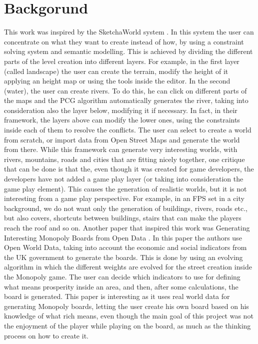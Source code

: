 \documentclass[conference]{IEEEtran}
\begin{document}
\section{Backgorund}

This work was inspired by the SketchaWorld system \cite{sketchaworld}. In this system the user can concentrate on what they want to create instead of how, by using a constraint solving system and semantic modelling. This is achieved by dividing the different parts of the level creation into different layers. For example, in the first layer (called landscape) the user can create the terrain, modify the height of it applying an height map or using the tools inside the editor. In the second (water), the user can create rivers. To do this, he can click on different parts of the maps and the PCG algorithm automatically generates the river, taking into consideration also the layer below, modifying it if necessary. In fact, in their framework, the layers above can modify the lower ones, using the constraints inside each of them to resolve the conflicts. The user can select to create a world from scratch, or import data from Open Street Maps and generate the world from there. \newline\newline
While this framework can generate very interesting worlds, with rivers, mountains, roads and cities that are fitting nicely together, one critique that can be done is that the, even though it was created for game developers, the developers have not added a game play layer (or taking into consideration the game play element). This causes the generation of realistic worlds, but it is not interesting from a game play perspective. For example, in an FPS set in a city background, we do not want only the generation of buildings, rivers, roads etc., but also covers, shortcuts between buildings, stairs that can make the players reach the roof and so on.
\newline
\newline
Another paper that inspired this work was Generating Interesting Monopoly Boards from Open Data \cite{monopoly}. In this paper the authors use Open World Data, taking into account the economic and social indicators from the UK government to generate the boards. This is done by using an evolving algorithm in which the different weights are evolved  for the street creation inside the Monopoly game. The user can decide which indicators to use for defining what means prosperity inside an area, and then, after some calculations, the board is generated. This paper is interesting as it uses real world data for generating Monopoly boards, letting the user create his own board based on his knowledge of what rich means, even though the main goal of this project was not the enjoyment of the player while playing on the board, as much as the thinking process on how to create it.
\end{document}
